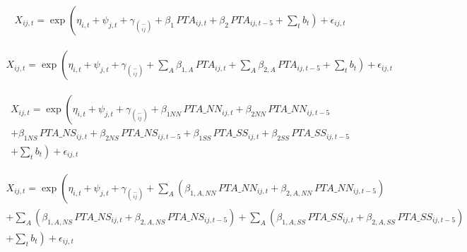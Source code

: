 \begin{multline}
    X_{ij,t} = \exp\left(\eta_{i,t} + \psi_{j,t} + \gamma_{\binom{-}{ij}} + \beta_{1} \, PTA_{ij,t} \right. + \beta_{2} \, PTA_{ij,t-5} + \left. \sum_{t} b_{t} \right) + \epsilon_{ij,t}
\end{multline}

\begin{multline}
    X_{ij,t} = \exp\left(\eta_{i,t} + \psi_{j,t} + \gamma_{\binom{-}{ij}} + \sum_{A} \beta_{1,A} \, PTA_{ij,t} \right. + \sum_{A} \beta_{2,A} \, PTA_{ij,t-5} + \left. \sum_{t} b_{t} \right) + \epsilon_{ij,t}
\end{multline}

\begin{multline}
    X_{ij,t} = \exp\left(\eta_{i,t} + \psi_{j,t} + \gamma_{\binom{-}{ij}} + \beta_{1NN} \, PTA\_NN_{ij,t} + \beta_{2NN} \, PTA\_NN_{ij,t-5} \right. \\
    + \beta_{1NS} \, PTA\_NS_{ij,t} + \beta_{2NS} \, PTA\_NS_{ij,t-5} + \beta_{1SS} \, PTA\_SS_{ij,t} + \beta_{2SS} \, PTA\_SS_{ij,t-5} \\
    + \left. \sum_{t} b_{t} \right) + \epsilon_{ij,t}
\end{multline}

\begin{multline}
    X_{ij,t} = \exp\left(\eta_{i,t} + \psi_{j,t} + \gamma_{\binom{-}{ij}} + \sum_{A}\left(\beta_{1,A,NN} \, PTA\_NN_{ij,t} + \beta_{2,A,NN} \, PTA\_NN_{ij,t-5}\right) \right. \\
    + \sum_{A}\left(\beta_{1,A,NS} \, PTA\_NS_{ij,t} + \beta_{2,A,NS} \, PTA\_NS_{ij,t-5}\right) + \sum_{A}\left(\beta_{1,A,SS} \, PTA\_SS_{ij,t} + \beta_{2,A,SS} \, PTA\_SS_{ij,t-5}\right) \\
    + \left. \sum_{t} b_{t} \right) + \epsilon_{ij,t}
\end{multline}